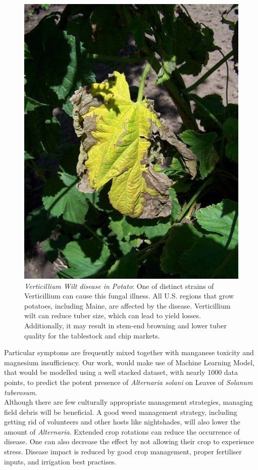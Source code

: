 \documentclass[conference]{IEEEtran}
\begin{document}
\begin{figure}[htbp]
\label{fig2}
\centerline{\includegraphics[width = \linewidth]{VerticilliumWilt}}
\caption{\textit{Verticillium Wilt disease in Potato}: One of distinct strains of Verticillium can cause this fungal illness. All U.S. regions that grow potatoes, including Maine, are affected by the disease. Verticillium wilt can reduce tuber size, which can lead to yield losses. Additionally, it may result in stem-end browning and lower tuber quality for the tablestock and chip markets.}
\end{figure}
Particular symptoms are frequently mixed together with manganese toxicity and magnesium insufficiency. Our work, would make use of Machine Learning Model, that would be modelled using a well stacked dataset, with nearly 1000 data points, to predict the potent presence of \textit{Alternaria solani} on Leaves of \textit{Solanum tuberosum}. \\

Although there are few culturally appropriate management strategies, managing field debris will be beneficial. A good weed management strategy, including getting rid of volunteers and other hosts like nightshades, will also lower the amount of \textit{Alternaria}. Extended crop rotations can reduce the occurrence of disease. One can also decrease the effect by not allowing their crop to experience stress. Disease impact is reduced by good crop management, proper fertiliser inputs, and irrigation best practises.
\end{document}
